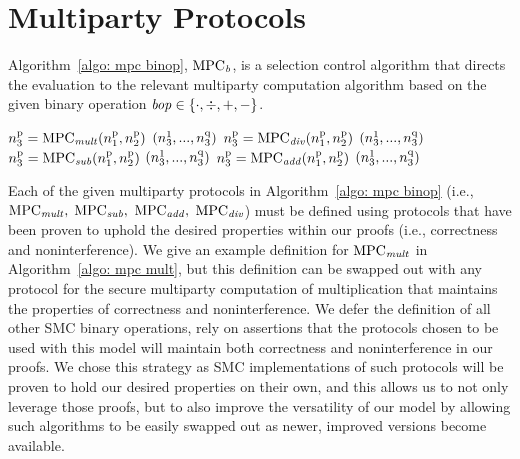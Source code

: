 

\section{Multiparty Protocols}
\label{app: mpc protocols}

Algorithm~\ref{algo: mpc binop}, $\mathrm{MPC}_\mathit{{b}}$, is a selection control algorithm that directs the evaluation to the relevant multiparty computation algorithm based on the given binary operation $\mathit{bop}\in\{\cdot,\div,+,-\}$. 

\begin{algorithm}[H]\footnotesize
\caption{$(\n^\pidA_3, ..., \n^\pidZ_3) \gets \MPC{b}(\binop, [\n^\pidA_1, ..., \n^\pidZ_1], [\n^\pidA_2, ..., \n^\pidZ_2])$}
\label{algo: mpc binop}
\begin{algorithmic}
 	\IF{$(\binop = \cdot)$}
			\STATE $n^{\mathrm{{p}}}_3 = \mathrm{MPC}_\mathit{{mult}}(n^{\mathrm{{p}}}_1, n^{\mathrm{{p}}}_2)$
		\ENDFOR
		\RETURN $(n^{\mathrm{{1}}}_3, ..., n^{\mathrm{{q}}}_3)$
	\ELSIF{$(\binop = \div)$}
			\STATE $n^{\mathrm{{p}}}_3 = \mathrm{MPC}_\mathit{{div}}(n^{\mathrm{{p}}}_1, n^{\mathrm{{p}}}_2)$
		\ENDFOR
		\RETURN $(n^{\mathrm{{1}}}_3, ..., n^{\mathrm{{q}}}_3)$
	\ELSIF{$(\binop = -)$}
			\STATE $n^{\mathrm{{p}}}_3 = \mathrm{MPC}_\mathit{{sub}}(n^{\mathrm{{p}}}_1, n^{\mathrm{{p}}}_2)$
		\ENDFOR
		\RETURN $(n^{\mathrm{{1}}}_3, ..., n^{\mathrm{{q}}}_3)$
	\ELSIF{$(\binop = +)$}
			\STATE $n^{\mathrm{{p}}}_3 = \mathrm{MPC}_\mathit{{add}}(n^{\mathrm{{p}}}_1, n^{\mathrm{{p}}}_2)$
		\ENDFOR
		\RETURN $(n^{\mathrm{{1}}}_3, ..., n^{\mathrm{{q}}}_3)$
	\ENDIF
\end{algorithmic}
\end{algorithm}


Each of the given multiparty protocols in Algorithm~\ref{algo: mpc binop} (i.e., $\mathrm{MPC}_\mathit{{mult}},$ $\mathrm{MPC}_\mathit{{sub}},$ $\mathrm{MPC}_\mathit{{add}},$ $\mathrm{MPC}_\mathit{{div}}$) must be defined using protocols that have been proven to uphold the desired properties within our proofs (i.e., correctness and noninterference). 
We give an example definition for $\mathrm{MPC}_\mathit{{mult}}$ in Algorithm~\ref{algo: mpc mult}, but this definition can be swapped out with any protocol for the secure multiparty computation of multiplication that maintains the properties of correctness and noninterference. 
We defer the definition of all other SMC binary operations, rely on assertions that the protocols chosen to be used with this model will maintain both correctness and noninterference in our proofs. 
We chose this strategy as SMC implementations of such protocols will be proven to hold our desired properties on their own, and this allows us to not only leverage those proofs, but to also improve the versatility of our model by allowing such algorithms to be easily swapped out as newer, improved versions become available. 



